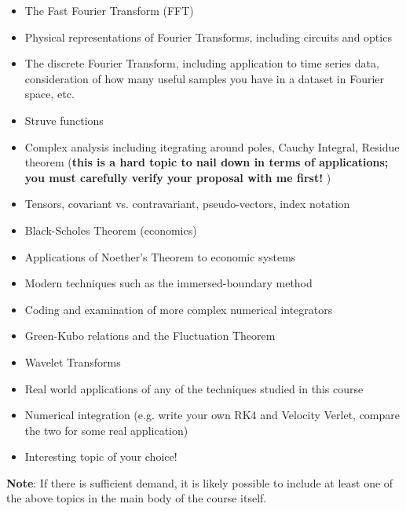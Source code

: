 \documentclass[12pt]{article}
\begin{document}
\begin{itemize}
  \item The Fast Fourier Transform (FFT)
  \item Physical representations of Fourier Transforms, including circuits and optics
  \item The discrete Fourier Transform, including application to time series data, consideration of how many useful samples you have in a dataset in Fourier space, etc.
  \item Struve functions
  \item Complex analysis including itegrating around poles, Cauchy
    Integral, Residue theorem (\textbf{this is a hard topic to nail
      down in terms of applications; you must carefully verify your
      proposal with me first! })
  \item Tensors, covariant vs. contravariant, pseudo-vectors, index notation
  \item Black-Scholes Theorem (economics)
  \item Applications of Noether's Theorem to economic systems
  \item Modern techniques such as the immersed-boundary method
  \item Coding and examination of more complex numerical integrators
  \item Green-Kubo relations and the Fluctuation Theorem
  \item Wavelet Transforms
  \item Real world applications of any of the techniques studied in this course
  \item Numerical integration (e.g. write your own RK4 and Velocity 
    Verlet, compare the two for some real application) 
  \item Interesting topic of your choice!
\end{itemize}

\textbf{Note}: If there is sufficient demand, it is likely possible to include at least one of the above topics in the main body of the course itself.
\end{document}
